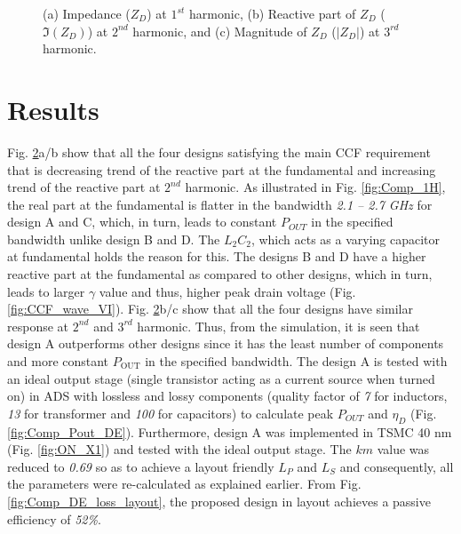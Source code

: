 \documentclass[conference]{IEEEtran}
\begin{document}
\begin{figure}[!t]
\begin{subfigure}{0.24\textwidth}
		\caption{}
		\label{fig:Comp_3H_Mag}
	\end{subfigure}
	\caption{(a) Impedance ($Z_D$) at $1^{st}$ harmonic, (b) Reactive part of $Z_D$ ($\Im(Z_D)$) at $2^{nd}$ harmonic, and (c) Magnitude of $Z_D$ ($|Z_D|$) at $3^{rd}$ harmonic.}
	\label{fig:Comp_1H_2H_3H}
	\vspace{-0.1in}
\end{figure}

\section{Results}
\label{section:Results}

Fig. \ref{fig:Comp_1H_2H_3H}a/b show that all the four designs satisfying the main CCF requirement that is decreasing trend of the reactive part at the fundamental and increasing trend of the reactive part at $2^{nd}$ harmonic.
As illustrated in Fig. \ref{fig:Comp_1H}, the real part at the fundamental is flatter in the bandwidth \textit{2.1 -- 2.7 GHz} for design A and C, which, in turn, leads to constant $P_{OUT}$ in the specified bandwidth unlike design B and D. The $L_2C_2$, which acts as a varying capacitor at fundamental holds the reason for this. The designs B and D have a higher reactive part at the fundamental as compared to other designs, which in turn, leads to larger $\gamma$ value and thus, higher peak drain voltage (Fig. \ref{fig:CCF_wave_VI}). Fig. \ref{fig:Comp_1H_2H_3H}b/c show that all the four designs have similar response at $2^{nd}$ and $3^{rd}$ harmonic. Thus, from the simulation, it is seen that design A outperforms other designs since it has the least number of components and more constant $P_{\text{OUT}}$ in the specified bandwidth. The design A is tested with an ideal output stage (single transistor acting  as a current source when turned on) in ADS with lossless and lossy components (quality factor of \textit{7} for inductors, \textit{13} for transformer and \textit{100} for capacitors) to calculate peak $P_{OUT}$ and $\eta_D$ (Fig. \ref{fig:Comp_Pout_DE}). Furthermore, design A was implemented in TSMC 40 nm (Fig. \ref{fig:ON_X1}) and tested with the ideal output stage. The $km$ value was reduced to \textit{0.69} so as to achieve a layout friendly $L_P$ and $L_S$ and consequently, all the parameters were re-calculated as explained earlier. From Fig. \ref{fig:Comp_DE_loss_layout}, the proposed design in layout achieves a passive efficiency of \textit{52\%}.
\end{document}
